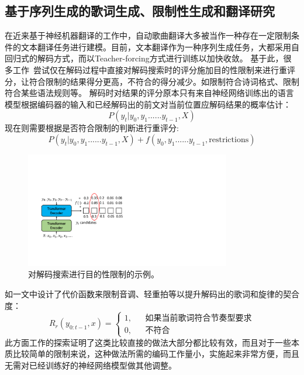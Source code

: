 \subsection{基于序列生成的歌词生成、限制性生成和翻译研究}
在近来基于神经机器翻译的工作\citep{gagast}中，自动歌曲翻译大多被当作一种存在一定限制条件的文本翻译任务进行建模。目前，文本翻译作为一种序列生成任务，大都采用自回归式的解码方式，而以Teacher-forcing方式进行训练以加快收敛。
基于此，很多工作~\citep{hokamp-liu-2017-lexically,zou_controllable,relyme}尝试仅在解码过程中直接对解码搜索时的评分施加目的性限制来进行重评分，让符合限制的结果得分更高，不符合的得分减少。如限制符合诗词格式、限制符合某些语法规则等。
解码时对结果的评分原本只有来自神经网络训练出的语言模型根据编码器的输入和已经解码出的前文对当前位置应解码结果的概率估计：
\begin{equation}
  P(y_t|y_0,y_1......y_{t-1}, X)
\end{equation}
现在则需要根据是否符合限制的判断进行重评分:
\begin{equation}
  P(y_t|y_0,y_1......y_{t-1}, X)+f(y_0,y_1......y_{t-1}, \mbox{restrictions})
\end{equation}
\begin{figure}[ht]
  \centering
  \includegraphics[width=0.80\textwidth]{figure/related/decoded_constrain.pdf}
  \caption{对解码搜索进行目的性限制的示例。}
\end{figure}
如\citet{relyme}一文中设计了代价函数来限制音调、轻重拍等以提升解码出的歌词和旋律的契合度：
\begin{equation*}
  R_r(y_{0:t-1},x) = \left\{
  \begin{array}{rcl}
    1, & & {\mbox{如果当前歌词符合节奏型要求}} \\
    0, & & {\mbox{不符合}}
  \end{array}
  \right.
\end{equation*}
%
此方面工作的探索证明了这类比较直接的做法大部分都比较有效，而且对于一些本质比较简单的限制来说，这种做法所需的编码工作量小，实施起来非常方便，而且无需对已经训练好的神经网络模型做其他调整。

